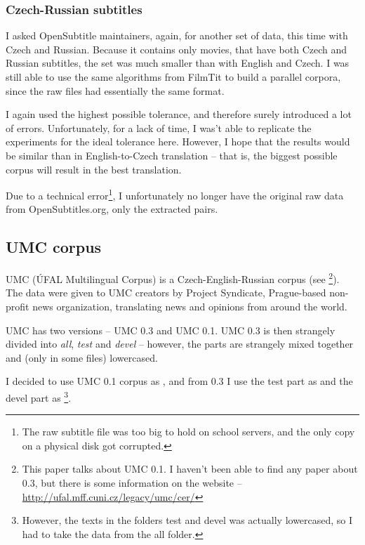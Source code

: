 \subsubsection{Czech-Russian subtitles}

I asked OpenSubtitle maintainers, again, for another set of data, this time with Czech and Russian.
Because it contains only movies, that have both Czech and Russian subtitles, the set was much smaller than with English and Czech. I was still able to use the same algorithms from FilmTit to build a parallel corpora, since the raw files had essentially the same format.

I again used the highest possible tolerance, and therefore surely introduced a lot of errors. Unfortunately, for a lack of time, I was't able to replicate the experiments for the ideal tolerance here. However, I hope that the results would be similar than in English-to-Czech translation -- that is, the biggest possible corpus will result in the best translation.

Due to a technical error\footnote{The raw subtitle file was too big to hold on school servers, and the only copy on a physical disk got corrupted.}, I unfortunately no longer have the original raw data from OpenSubtitles.org, only the extracted pairs. 


\subsection{UMC corpus}
\label{corpora:umc}
UMC (ÚFAL Multilingual Corpus) is a Czech-English-Russian corpus (see \cite{umc}\footnote{This paper talks about UMC 0.1. I haven't been able to find any paper about 0.3, but there is some information on the website -- \url{http://ufal.mff.cuni.cz/legacy/umc/cer/}}). The data were given to UMC creators by Project Syndicate, Prague-based non-profit news organization, translating news and opinions from around the world.

UMC has two versions -- UMC 0.3 and UMC 0.1. UMC 0.3 is then strangely divided into \emph{all}, \emph{test} and \emph{devel} -- however, the parts are strangely mixed together and (only in some files) lowercased.

I decided to use UMC 0.1 corpus as , and from 0.3 I use the test part as  and the devel part as \footnote{However, the texts in the folders test and devel was actually lowercased, so I had to take the data from the all folder.}.



